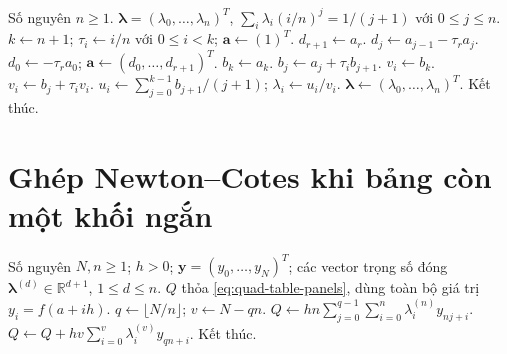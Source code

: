 \documentclass[12pt,a4paper,oneside]{book}
\numberwithin{algorithm}{chapter}
\theoremstyle{definition}
\newcommand{\R}{\mathbb{R}}
\begin{document}
\begin{algorithm}[H]
\caption{Dựng trọng số Newton--Cotes đóng bậc $n$ -- chi tiết}
\label{alg:quad-nc-degree-weights-detailed}
\small
\begin{algorithmic}[1]
\Require Số nguyên $n\geq1$.
\Ensure $\boldsymbol\lambda=(\lambda_0,\ldots,\lambda_n)^T$, $\sum_i\lambda_i(i/n)^j=1/(j+1)$ với $0\leq j\leq n$.
\State $k\gets n+1$; $\tau_i\gets i/n$ với $0\leq i<k$; $\boldsymbol a\gets(1)^T$.
  \State $d_{r+1}\gets a_r$.
    \State $d_j\gets a_{j-1}-\tau_ra_j$.
  \EndFor
  \Statex
  \State $d_0\gets-\tau_ra_0$; $\boldsymbol a\gets(d_0,\ldots,d_{r+1})^T$.
\EndFor
\Statex
{}
  \State $b_k\gets a_k$.
    \State $b_j\gets a_j+\tau_ib_{j+1}$.
  \EndFor
  \Statex
  \State $v_i\gets b_k$.
    \State $v_i\gets b_j+\tau_iv_i$.
  \EndFor
  \Statex
  \State $u_i\gets\sum_{j=0}^{k-1}b_{j+1}/(j+1)$; $\lambda_i\gets u_i/v_i$.
\EndFor
\Statex
\State $\boldsymbol\lambda\gets(\lambda_0,\ldots,\lambda_n)^T$.
\State Kết thúc.
\end{algorithmic}
\end{algorithm}

\section{Ghép Newton--Cotes khi bảng còn một khối ngắn}
\begin{algorithm}[H]
\caption{Tính tích phân từ toàn bộ một bảng đều}
\label{alg:quad-table-panels}
\begin{algorithmic}[1]
\Require Số nguyên $N,n\geq1$; $h>0$; $\boldsymbol y=(y_0,\ldots,y_N)^T$; các vector trọng số đóng $\boldsymbol\lambda^{(d)}\in\R^{d+1}$, $1\leq d\leq n$.
\Ensure $Q$ thỏa \eqref{eq:quad-table-panels}, dùng toàn bộ giá trị $y_i=f(a+ih)$.
\State $q\gets\lfloor N/n\rfloor$; $v\gets N-qn$.
\State $Q\gets hn\sum_{j=0}^{q-1}\sum_{i=0}^n\lambda_i^{(n)}y_{nj+i}$.
  \State $Q\gets Q+hv\sum_{i=0}^v\lambda_i^{(v)}y_{qn+i}$.
\EndIf
\Statex
\State Kết thúc.
\end{algorithmic}
\end{algorithm}

\end{document}
